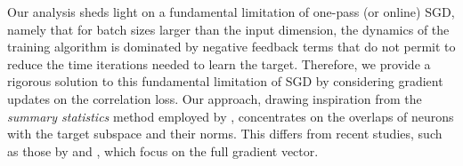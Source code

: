 Our analysis sheds light on a fundamental limitation of one-pass (or online) SGD, namely that for batch sizes larger than the input dimension, the dynamics of the training algorithm is dominated by negative feedback terms that do not permit to reduce the time iterations needed to learn the target. Therefore, we provide a rigorous solution to this fundamental limitation of SGD by considering gradient updates on the correlation loss.
Our approach, drawing inspiration from the \textit{summary statistics} method employed by \cite{saad1995line,arous2021online,arous2022high}, concentrates on the overlaps of neurons with the target subspace and their norms. This differs from recent studies, such as those by \cite{abbe2022merged} and \cite{damian2022neural}, which focus on the full gradient vector.



